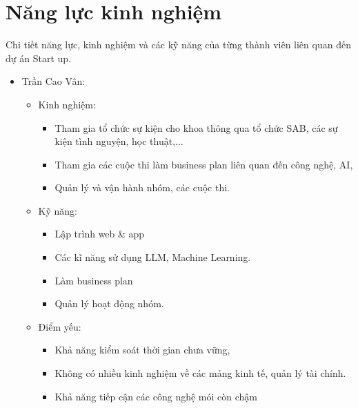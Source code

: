 \section{Năng lực kinh nghiệm}

Chi tiết năng lực, kinh nghiệm và các kỹ năng của từng thành viên liên quan đến dự án Start up.

\begin{itemize}
    \item Trần Cao Vân:
    \begin{itemize}
        \item Kinh nghiệm: 
        \begin{itemize}
            \item Tham gia tổ chức sự kiện cho khoa thông qua tổ chức SAB, các sự kiện tình nguyện, học thuật,...
            \item Tham gia các cuộc thi làm business plan liên quan đến công nghệ, AI, 
            \item Quản lý và vận hành nhóm, các cuộc thi.
        \end{itemize}
        \item Kỹ năng: 
        \begin{itemize}
            \item Lập trình web \& app
            \item Các kĩ năng sử dụng LLM, Machine Learning.
            \item Làm business plan 
            \item Quản lý hoạt động nhóm.
        \end{itemize}
        \item Điểm yếu: 
        \begin{itemize}
            \item Khả năng kiểm soát thời gian chưa vững, 
            \item Không có nhiều kinh nghiệm về các mảng kinh tế, quản lý tài chính.
            \item Khả năng tiếp cận các công nghệ mói còn chậm
        \end{itemize}
    \end{itemize}


\end{itemize}
